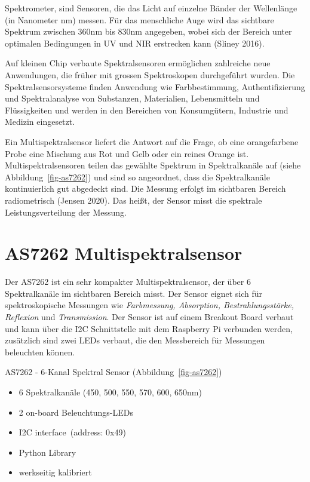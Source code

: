 \documentclass[
  11pt,
  a4paper,
  oneside, openany  ,captions=tableheading
]{scrbook}
\providecommand{\tightlist}{%
  \setlength{\itemsep}{0pt}\setlength{\parskip}{0pt}}
\theoremstyle{remark}
\renewcommand{\markright}[1]{\def\chaptertitle{#1}} %
\begin{document}
\markright{Spektrometer}

Spektrometer, sind Sensoren, die das Licht auf einzelne Bänder der
Wellenlänge (in Nanometer nm) messen. Für das menschliche Auge wird das
sichtbare Spektrum zwischen 360nm bis 830nm angegeben, wobei sich der
Bereich unter optimalen Bedingungen in UV und NIR erstrecken kann
(Sliney 2016).

Auf kleinen Chip verbaute Spektralsensoren ermöglichen zahlreiche neue
Anwendungen, die früher mit grossen Spektroskopen durchgeführt wurden.
Die Spektralsensorsysteme finden Anwendung wie Farbbestimmung,
Authentifizierung und Spektralanalyse von Substanzen, Materialien,
Lebensmitteln und Flüssigkeiten und werden in den Bereichen von
Konsumgütern, Industrie und Medizin eingesetzt.

Ein Multispektralsensor liefert die Antwort auf die Frage, ob eine
orangefarbene Probe eine Mischung aus Rot und Gelb oder ein reines
Orange ist. Multispektralsensoren teilen das gewählte Spektrum in
Spektralkanäle auf (siehe Abbildung~\ref{fig-as7262}) und sind so
angeordnet, dass die Spektralkanäle kontinuierlich gut abgedeckt sind.
Die Messung erfolgt im sichtbaren Bereich radiometrisch (Jensen 2020).
Das heißt, der Sensor misst die spektrale Leistungsverteilung der
Messung.

\section*{\texorpdfstring{AS7262
Multispektralsensor}{AS7262 Multispektralsensor}}\label{as7262-multispektralsensor}

\markright{AS7262 Multispektralsensor\index{AS7262}}

Der AS7262 ist ein sehr kompakter Multispektralsensor, der über 6
Spektralkanäle im sichtbaren Bereich misst. Der Sensor eignet sich für
spektroskopische Messungen wie \emph{Farbmessung, Absorption,
Bestrahlungsstärke, Reflexion} und \emph{Transmission}. Der Sensor ist
auf einem Breakout Board verbaut und kann über die I2C Schnittstelle mit
dem Raspberry Pi verbunden werden, zusätzlich sind zwei LEDs verbaut,
die den Messbereich für Messungen beleuchten können.

AS7262 - 6-Kanal Spektral Sensor (Abbildung~\ref{fig-as7262})

\begin{itemize}
\tightlist
\item
  6 Spektralkanäle (450, 500, 550, 570, 600, 650nm)
\item
  2 on-board Beleuchtungs-LEDs
\item
  I2C interface~(address: 0x49)
\item
  Python Library
\item
  werkseitig kalibriert
\end{itemize}
\end{document}

